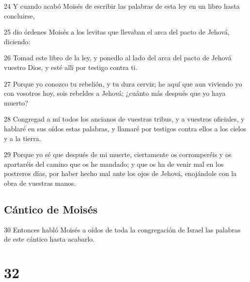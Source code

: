 \par 24 Y cuando acabó Moisés de escribir las palabras de esta ley en un libro hasta concluirse,
\par 25 dio órdenes Moisés a los levitas que llevaban el arca del pacto de Jehová, diciendo:
\par 26 Tomad este libro de la ley, y ponedlo al lado del arca del pacto de Jehová vuestro Dios, y esté allí por testigo contra ti.
\par 27 Porque yo conozco tu rebelión, y tu dura cerviz; he aquí que aun viviendo yo con vosotros hoy, sois rebeldes a Jehová; ¿cuánto más después que yo haya muerto?
\par 28 Congregad a mí todos los ancianos de vuestras tribus, y a vuestros oficiales, y hablaré en sus oídos estas palabras, y llamaré por testigos contra ellos a los cielos y a la tierra.
\par 29 Porque yo sé que después de mi muerte, ciertamente os corromperéis y os apartaréis del camino que os he mandado; y que os ha de venir mal en los postreros días, por haber hecho mal ante los ojos de Jehová, enojándole con la obra de vuestras manos.

\section{Cántico de Moisés}

\par 30 Entonces habló Moisés a oídos de toda la congregación de Israel las palabras de este cántico hasta acabarlo.

\chapter{32}

